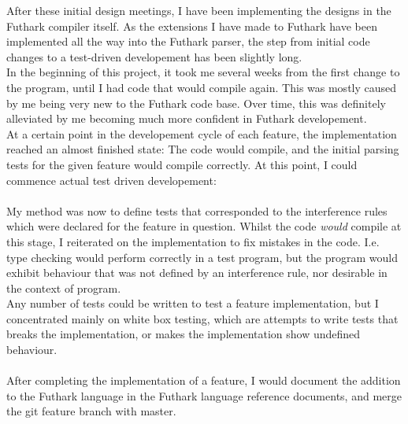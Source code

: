 After these initial design meetings, I have been implementing the designs in the
Futhark compiler itself. As the extensions I have made to Futhark have been
implemented all the way into the Futhark parser, the step from initial code
changes to a test-driven developement has been slightly long.
\\
In the beginning of this project, it took me several weeks from the first change to the program, until
I had code that would compile again. This was mostly caused by me being very
new to the Futhark code base. Over time, this was definitely alleviated by me
becoming much more confident in Futhark developement.
\\
At a certain point in the developement cycle of each feature, the implementation
reached an almost finished state: The code would compile, and the initial
parsing tests for the given feature would compile correctly. At this point, I
could commence actual test driven developement:
\\
\\
My method was now to define tests that corresponded to the interference rules
which were declared for the feature in question. Whilst the code \textit{would}
compile at this stage, I reiterated on the implementation to fix mistakes in the
code.
I.e. type checking would perform correctly in a test program, but the program
would exhibit behaviour that was not defined by an interference rule, nor
desirable in the context of program.
\\
Any number of tests could be written to test a feature implementation, but I
concentrated mainly on white box testing, which are attempts to write tests that
breaks the implementation, or makes the implementation show undefined behaviour.
\\
\\
After completing the implementation of a feature, I would document the addition
to the Futhark language in the Futhark language reference documents, and merge
the git feature branch with master.
